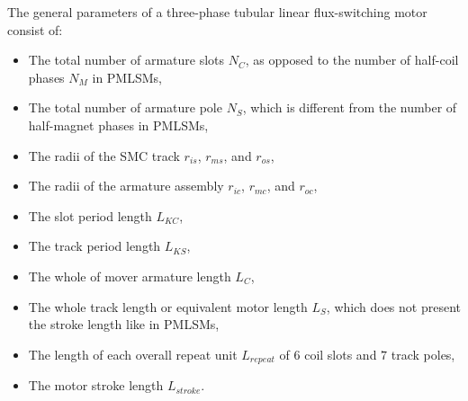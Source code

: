        
        The general parameters of a three-phase tubular linear flux-switching motor consist of:
        
        \begin{itemize}
            \item The total number of armature slots $N_C$, as opposed to the number of half-coil phases $N_M$ in \acsp{PMLSM},
            \item The total number of armature pole $N_S$, which is different from the number of half-magnet phases in \acsp{PMLSM},
            \item The radii of the \acs{SMC} track $r_{is}$, $r_{ms}$, and $r_{os}$,
            \item The radii of the armature assembly $r_{ic}$, $r_{mc}$, and $r_{oc}$,
            \item The slot period length $L_{KC}$,
            \item The track period length $L_{KS}$,
            \item The whole of mover armature length $L_{C}$,
            \item The whole track length or equivalent motor length $L_{S}$, which does not present the stroke length like in \acsp{PMLSM},
            \item The length of each overall repeat unit $L_{repeat}$ of $6$ coil slots and $7$ track poles,
            \item The motor stroke length $L_{stroke}$.
        \end{itemize}
        
